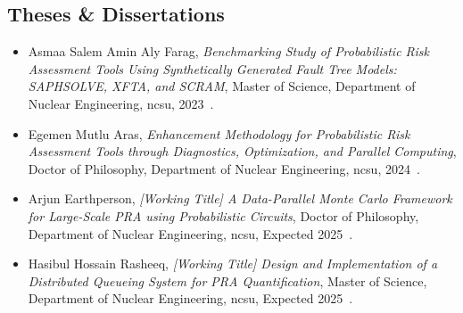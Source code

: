 \subsection{Theses \& Dissertations}
\begin{itemize}
    \item {Asmaa Salem Amin Aly Farag, \textit{Benchmarking Study of Probabilistic Risk Assessment Tools Using Synthetically Generated Fault Tree Models: SAPHSOLVE, XFTA, and SCRAM}, Master of Science, Department of Nuclear Engineering, \acrshort{ncsu}, 2023~\cite{farag_thesis_2023}.}
    \item {Egemen Mutlu Aras, \textit{Enhancement Methodology for Probabilistic Risk Assessment Tools through Diagnostics, Optimization, and Parallel Computing}, Doctor of Philosophy, Department of Nuclear Engineering, \acrshort{ncsu}, 2024~\cite{aras_dissertation_2024}.}
    \item {Arjun Earthperson, \textit{[Working Title] A Data-Parallel Monte Carlo Framework for Large-Scale PRA using Probabilistic Circuits}, Doctor of Philosophy, Department of Nuclear Engineering, \acrshort{ncsu}, Expected 2025~\cite{earthperson_dissertation_2025}.}
    \item {Hasibul Hossain Rasheeq, \textit{[Working Title] Design and Implementation of a Distributed Queueing System for PRA Quantification}, Master of Science, Department of Nuclear Engineering, \acrshort{ncsu}, Expected 2025~\cite{rasheeq_thesis_2025}.}
\end{itemize}